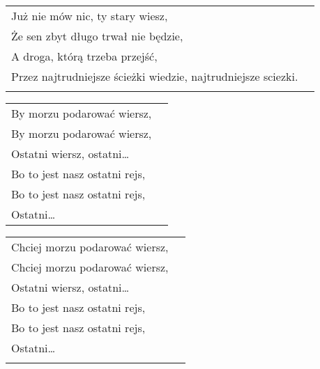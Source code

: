 \documentclass[a5paper]{article}
\begin{document}
\noindent
\begin{tabular}{@{}p{8.00cm}p{3cm}@{}}
Już nie mów nic, ty stary wiesz, \\
Że sen zbyt długo trwał nie będzie,	\\
A droga, którą trzeba przejść, \\
Przez najtrudniejsze ścieżki wiedzie, najtrudniejsze sciezki.\\ \\
\end{tabular}

\noindent
\begin{tabular}{@{}p{8.00cm}p{3cm}@{}}
By morzu podarować wiersz, \\
By morzu podarować wiersz, \\
Ostatni wiersz, ostatni… \\
Bo to jest nasz ostatni rejs, \\
Bo to jest nasz ostatni rejs, \\
Ostatni…
\end{tabular}
\noindent
\begin{tabular}{@{}p{8.00cm}p{3cm}@{}}
Chciej morzu podarować wiersz, \\
Chciej morzu podarować wiersz, \\
Ostatni wiersz, ostatni… \\
Bo to jest nasz ostatni rejs, \\
Bo to jest nasz ostatni rejs, \\
Ostatni… \\ \\
\end{tabular}
\end{document}
